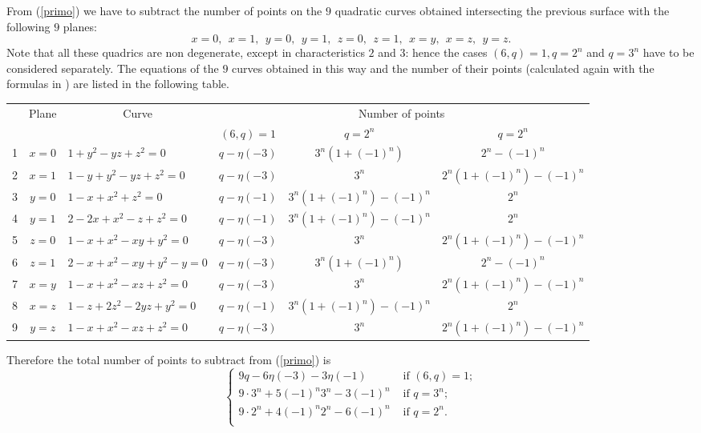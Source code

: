 \documentclass[10pt,a4paper,twoside]{article}
\begin{document}
From (\ref{primo}) we have to subtract the number of points on the $9$ quadratic
curves obtained intersecting the previous surface with the following $9$ planes:
$$x=0,\ \ x=1,\ \ y=0,\ \ y=1,\ \ z=0,\ \ z=1,\ \ x=y,\ \  x=z,\ \ y=z.$$
Note that all these quadrics are non degenerate, except in characteristics
$2$ and $3$: hence
the cases $(6,q)=1, q=2^n$ and $q=3^n$ have to be considered separately.
The equations of the $9$  curves obtained in this way and
the number of their points (calculated again with
the formulas in \cite[Theorem 6.26 -- 6.32]{LN}) are listed in the following table.
\begin{center}
\begin{tabular}{|l|c|l|c|c|c|}
\hline
   & Plane &        \multicolumn{1}{|c|}{Curve}          &
\multicolumn{3}{c|}{Number of points}\\
\cline{4-6}
&&& $(6,q)=1$ & $q=2^n$ & $q=2^n$\\
\hline
 1 & $x=0$ & $1+{y}^{2}-yz+{z}^{2}=0$ &
$q-\eta(-3)$ & $3^n(1+(-1)^n)$ & $2^n-(-1)^n$\\
\hline
 2 & $x=1$ &    $1-y+y^2-yz+z^2=0$    &
$q-\eta(-3)$ & $3^n$ &$2^n(1+(-1)^n)-(-1)^n$\\
\hline
 3 & $y=0$ &     $1-x+x^2+z^2=0$      &
$q-\eta(-1)$  & $3^n(1+(-1)^n)-(-1)^n$ &$2^n$\\
\hline
 4 & $y=1$ &    $2-2x+x^2-z+z^2=0$    &
$q-\eta(-1)$  & $3^n(1+(-1)^n)-(-1)^n$ & $2^n$\\
\hline
 5 & $z=0$ &    $1-x+x^2-xy+y^2=0$    &
$q-\eta(-3)$ & $3^n$ &$2^n(1+(-1)^n)-(-1)^n$\\
\hline
 6 & $z=1$ &   $2-x+x^2-xy+y^2-y=0$   &
$q-\eta(-3)$ & $3^n(1+(-1)^n)$&$2^n-(-1)^n$ \\
\hline
 7 & $x=y$ &    $1-x+x^2-xz+z^2=0$    &
$q-\eta(-3)$  & $3^n$&$2^n(1+(-1)^n)-(-1)^n$\\
\hline
 8 & $x=z$ &   $1-z+2z^2-2yz+y^2=0$   &
$q-\eta(-1)$ & $3^n(1+(-1)^n)-(-1)^n$ &$2^n$\\
\hline
 9 & $y=z$ &    $1-x+x^2-xz+z^2=0$    &
$q-\eta(-3)$  & $3^n$& $2^n(1+(-1)^n)-(-1)^n$\\
\hline
\end{tabular}
\end{center}
Therefore the total number of points to subtract from (\ref{primo}) is
\begin{equation}\label{secondo}
\left\{
\begin{array}{ll}
9q-6\eta(-3)-3\eta(-1) &
\textrm{ if } (6,q)=1;\\
9\cdot3^n+5(-1)^n3^n-3(-1)^n&\textrm{ if } q=3^n;\\
9\cdot2^n+4(-1)^n2^n-6(-1)^n&\textrm{ if } q=2^n.\\
\end{array}
\right.
\end{equation}
\end{document}
